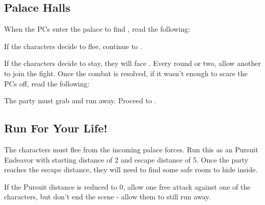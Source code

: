\subsection{Palace Halls}
\label{ssec:stormingPalaceHalls}

When the PCs enter the palace to find \npcTroublemaker{}, read the following:


If the characters decide to flee, continue to .

If the characters decide to stay, they will face \enemyQueensGuard{}. Every round or two, allow another \enemyRioter{} to join the fight. Once the combat is resolved, if it wasn't enough to scare the PCs off, read the following:


The party must grab \npcTroublemaker{} and run away. Proceed to .

\subsection{Run For Your Life!}
\label{ssec:stormingPalaceFlee}

The characters must flee from the incoming palace forces. Run this as an Pursuit Endeavor with starting distance of 2 and escape distance of 5. Once the party reaches the escape distance, they will need to find some safe room to hide inside.

If the Pursuit distance is reduced to 0, allow \enemyQueensGuard{} one free attack against one of the characters, but don't end the scene - allow them to still run away.

